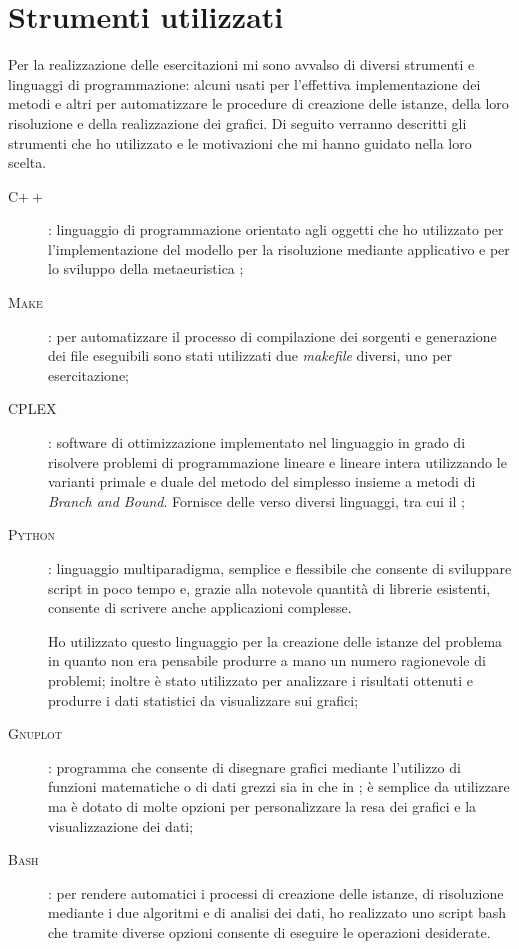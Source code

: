 \section{Strumenti utilizzati}
Per la realizzazione delle esercitazioni mi sono avvalso di diversi strumenti e linguaggi di programmazione: alcuni usati per l'effettiva implementazione dei metodi e altri per automatizzare le procedure di creazione delle istanze, della loro risoluzione e della realizzazione dei grafici.
Di seguito verranno descritti gli strumenti che ho utilizzato e le motivazioni che mi hanno guidato nella loro scelta.

\begin{description}
	\item[\textsc{C$++$}]: linguaggio di programmazione orientato agli oggetti che ho utilizzato per l'implementazione del modello per la risoluzione mediante applicativo  e per lo sviluppo della metaeuristica \tabu;
	\item[\textsc{Make}]: per automatizzare il processo di compilazione dei sorgenti e generazione dei file eseguibili sono stati utilizzati due \emph{makefile} diversi, uno per esercitazione;
	\item[\textsc{CPLEX}]: software di ottimizzazione implementato nel linguaggio  in grado di risolvere problemi di programmazione lineare e lineare intera utilizzando le varianti primale e duale del metodo del simplesso insieme a metodi di \emph{Branch and Bound}. Fornisce delle  verso diversi linguaggi, tra cui il ;
	\item[\textsc{Python}]: linguaggio multiparadigma, semplice e flessibile che consente di sviluppare script in poco tempo e, grazie alla notevole quantità di librerie esistenti, consente di scrivere anche applicazioni complesse.
	
	Ho utilizzato questo linguaggio per la creazione delle istanze del problema in quanto non era pensabile produrre a mano un numero ragionevole di problemi; inoltre è stato utilizzato per analizzare i risultati ottenuti e produrre i dati statistici da visualizzare sui grafici;
	\item[\textsc{Gnuplot}]: programma che consente di disegnare grafici mediante l'utilizzo di funzioni matematiche o di dati grezzi sia in  che in ; è semplice da utilizzare ma è dotato di molte opzioni per personalizzare la resa dei grafici e la visualizzazione dei dati;
	\item[\textsc{Bash}]: per rendere automatici i processi di creazione delle istanze, di risoluzione mediante i due algoritmi e di analisi dei dati, ho realizzato uno script bash che tramite diverse opzioni consente di eseguire le operazioni desiderate.
\end{description}


